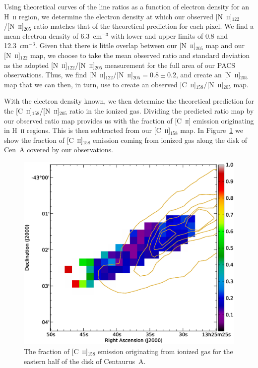 Using theoretical curves of the line ratios as a function of electron density for an H~\textsc{ii} region, we determine the electron density at which our observed [N~\textsc{ii}]$_{122}$/[N~\textsc{ii}]$_{205}$ ratio matches that of the theoretical prediction for each pixel.  We find a mean electron density of 6.3~cm$^{-3}$ with lower and upper limits of 0.8 and 12.3~cm$^{-3}$.  Given that there is little overlap between our [N~\textsc{ii}]$_{205}$ map and our [N~\textsc{ii}]$_{122}$ map, we choose to take the mean observed ratio and standard deviation as the adopted [N~\textsc{ii}]$_{122}$/[N~\textsc{ii}]$_{205}$ measurement for the full area of our PACS observations.  Thus, we find [N~\textsc{ii}]$_{122}$/[N~\textsc{ii}]$_{205} = 0.8 \pm 0.2$, and create an [N~\textsc{ii}]$_{205}$ map that we can then, in turn, use to create an observed [C~\textsc{ii}]$_{158}$/[N~\textsc{ii}]$_{205}$ map.

With the electron density known, we then determine the theoretical prediction for the [C~\textsc{ii}]$_{158}$/[N~\textsc{ii}]$_{205}$ ratio in the ionized gas.  Dividing the predicted ratio map by our observed ratio map provides us with the fraction of [C~\textsc{ii}] emission originating in H~\textsc{ii} regions.  This is then subtracted from our [C~\textsc{ii}]$_{158}$ map.  In Figure~\ref{fig:cii_ion_map} we show the fraction of [C~\textsc{ii}]$_{158}$ emission coming from ionized gas along the disk of Cen~A covered by our observations.

\begin{figure}
\includegraphics[width=\columnwidth]{ch4/CenA_ion_fraction}
\caption{The fraction of [C~\textsc{ii}]$_{158}$ emission originating from ionized gas for the eastern half of the disk of Centaurus~A.}
\label{fig:cii_ion_map}
\end{figure}


